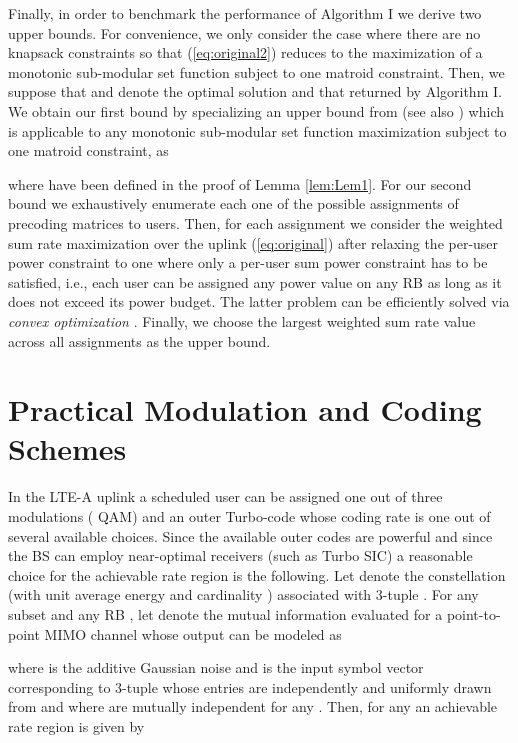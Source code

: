 \documentclass[11pt] {article}
\begin{document}
Finally, in order to benchmark the performance of Algorithm I we derive two upper bounds. For convenience, we only consider the case where there are no knapsack constraints so that (\ref{eq:original2}) reduces to the maximization of a monotonic sub-modular set function  subject to one matroid constraint. Then,  we suppose that  and  denote the optimal solution and that returned by Algorithm I. We obtain our first bound by specializing an  upper bound from \cite{Minoux:greedy}   (see also \cite{krause:greedy}) which is applicable to any monotonic sub-modular set function maximization subject to one matroid constraint, as

where  have been defined in the proof of Lemma \ref{lem:Lem1}.
For our second bound we exhaustively enumerate each one of the  possible assignments of precoding matrices to users. Then, for each assignment we consider the weighted sum rate maximization over the uplink (\ref{eq:original}) after relaxing the per-user power constraint to one where only a per-user sum power constraint has to be satisfied, i.e., each user can be assigned any power value on any RB as long as it does not exceed its power budget. The latter problem can be efficiently solved via {\em convex optimization} \cite{yuWei:WF,mohseni:jsac}. Finally, we choose the largest weighted sum rate value across all assignments as the upper bound.



\section{Practical Modulation and Coding Schemes}


In the LTE-A uplink a scheduled user can be assigned one out of three modulations ( QAM) and an outer Turbo-code whose coding rate is one out of several available choices. Since the available outer codes are powerful and since the BS can employ near-optimal receivers (such as Turbo SIC) a reasonable choice for the achievable rate region is the following. Let  denote the constellation (with unit average energy and cardinality ) associated with 3-tuple . For any subset  and any RB , let  denote the mutual information evaluated for a point-to-point MIMO channel whose output can be modeled as

 where  is the additive Gaussian noise and  is the input symbol vector corresponding to 3-tuple  whose entries are independently and uniformly drawn from  and where  are mutually independent for any .
 Then, for any  an achievable rate region is given by
   
\end{document}
